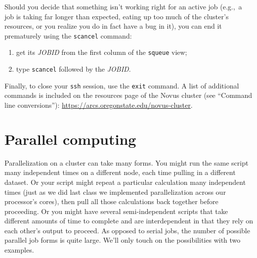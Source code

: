 \documentclass[12pt,letterpaper]{article}
\begin{document}
Should you decide that something isn't working right for an active job
(e.g.,~a job is taking far longer than expected, eating up too much of the cluster's resources, or you realize you do in fact have a bug in it), 
you can end it prematurely using the \texttt{scancel} command:
\begin{enumerate}
	\item get its \emph{JOBID} from the first column of the \texttt{squeue} view;
	\item type \texttt{scancel} followed by the \emph{JOBID}.
\end{enumerate}

Finally, to close your \texttt{ssh} session, use the \texttt{exit} command.
A list of additional commands is included on the resources page of the Novus cluster (see ``Command line conversions''): 
\url{https://arcs.oregonstate.edu/novus-cluster}. 


\section{Parallel computing}

Parallelization on a cluster can take many forms.
You might run the same script many independent times on a different node, each time pulling in a different dataset.
Or your script might repeat a particular calculation many independent times (just as we did last class we implemented parallelization across our processor's cores), then pull all those calculations back together before proceeding.
Or you might have several semi-independent scripts that take different amounts of time to complete and are interdependent in that they rely on each other's output to proceed.
As opposed to serial jobs, the number of possible parallel job forms is quite large.
We'll only touch on the possibilities with two examples.
\end{document}
